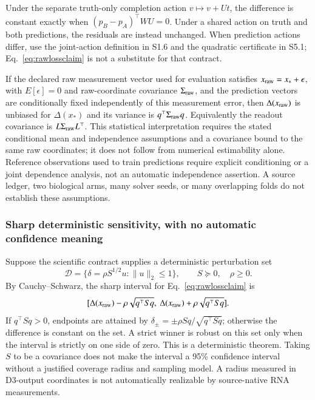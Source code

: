 \documentclass[11pt]{article}
\begin{document}
Under the separate truth-only completion action $v\mapsto v+Ut$, the difference is constant exactly when $(p_B-p_A)^\top WU=0$. Under a shared action on truth and both predictions, the residuals are instead unchanged. When prediction actions differ, use the joint-action definition in S1.6 and the quadratic certificate in S5.1; Eq.~\ref{eq:rawlossclaim} is not a substitute for that contract.

If the declared raw measurement vector used for evaluation satisfies $x_{\rm raw}=x_*+\epsilon$, with $E[\epsilon]=0$ and raw-coordinate covariance $\Sigma_{\rm raw}$, and the prediction vectors are conditionally fixed independently of this measurement error, then $\Delta(x_{\rm raw})$ is unbiased for $\Delta(x_*)$ and its variance is $q^\top\Sigma_{\rm raw} q$. Equivalently the readout covariance is $L\Sigma_{\rm raw} L^\top$. This statistical interpretation requires the stated conditional mean and independence assumptions and a covariance bound to the same raw coordinates; it does not follow from numerical estimability alone. Reference observations used to train predictions require explicit conditioning or a joint dependence analysis, not an automatic independence assertion. A source ledger, two biological arms, many solver seeds, or many overlapping folds do not establish these assumptions.

\subsubsection{Sharp deterministic sensitivity, with no automatic confidence meaning}
Suppose the scientific contract supplies a deterministic perturbation set
\[
\mathcal D=\{\delta=\rho S^{1/2}u:\|u\|_2\leq1\},\qquad S\succeq0,\quad\rho\ge0.
\]
By Cauchy--Schwarz, the sharp interval for Eq.~\ref{eq:rawlossclaim} is
\[
[\Delta(x_{\rm raw})-\rho\sqrt{q^\top Sq},\ \Delta(x_{\rm raw})+\rho\sqrt{q^\top Sq}].
\]
If $q^\top Sq>0$, endpoints are attained by $\delta_\pm=\pm\rho Sq/\sqrt{q^\top Sq}$; otherwise the difference is constant on the set. A strict winner is robust on this set only when the interval is strictly on one side of zero. This is a deterministic theorem. Taking $S$ to be a covariance does not make the interval a 95\% confidence interval without a justified coverage radius and sampling model. A radius measured in D3-output coordinates is not automatically realizable by source-native RNA measurements.
\end{document}
